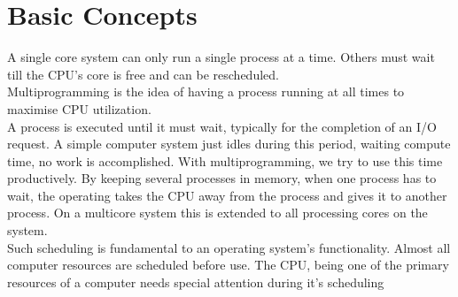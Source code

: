\documentclass{book}
\begin{document}
        \section{Basic Concepts}
            A single core system can only run a single process at a time. Others must wait
            till the CPU's core is free and can be rescheduled.\\
            Multiprogramming is the idea of having a process running at all times to maximise
            CPU utilization.\\
            A process is executed until it must wait, typically for the completion of an I/O 
            request. A simple computer system just idles during this period, waiting compute time,
            no work is accomplished. With multiprogramming, we try to use this time productively.
            By keeping several processes in memory, when one process has to wait, the operating takes 
            the CPU away from the process and gives it to another process. On a multicore system this
            is extended to all processing cores on the system.\\
            Such scheduling is fundamental to an operating system's functionality. Almost all 
            computer resources are scheduled before use. The CPU, being one of the primary resources
            of a computer needs special attention during it's scheduling
\end{document}
